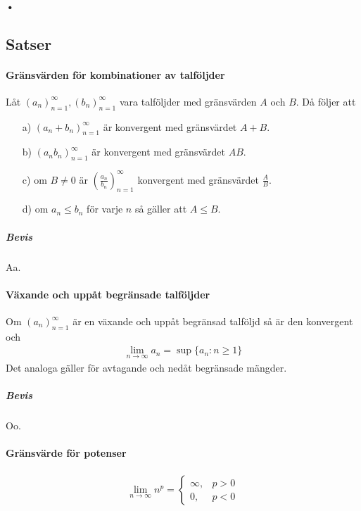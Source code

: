 \paragraph{•}

\subsection{Satser}

\paragraph{Gränsvärden för kombinationer av talföljder}
Låt $\left(a_n\right)_{n = 1}^\infty, \left(b_n\right)_{n = 1}^\infty$ vara talföljder med gränsvärden $A$ och $B$. Då följer att
\begin{enumerate}
	\item[a)] $\left(a_n + b_n\right)_{n = 1}^\infty$ är konvergent med gränsvärdet $A + B$.
	\item[b)] $\left(a_n b_n\right)_{n = 1}^\infty$ är konvergent med gränsvärdet $AB$.
	\item[c)] om $B \neq 0$ är $\left(\frac{a_n}{b_n}\right)_{n = 1}^\infty$ konvergent med gränsvärdet $\frac{A}{B}$.
	\item[d)] om $a_n \leq b_n$ för varje $n$ så gäller att $A \leq B$.
\end{enumerate}

\subparagraph{Bevis}
Aa.

\paragraph{Växande och uppåt begränsade talföljder}
Om $\left(a_n\right)_{n = 1}^\infty$ är en växande och uppåt begränsad talföljd så är den konvergent och
\begin{align*}
	\lim_{n\to\infty} a_n = \sup{\{a_n: n \geq 1\}}
\end{align*}
Det analoga gäller för avtagande och nedåt begränsade mängder.

\subparagraph{Bevis}
Oo.

\paragraph{Gränsvärde för potenser}
\begin{align*}
	\lim_{n\to\infty} n^p =
	\begin{cases}
		\infty, & p > 0\\
		0,      & p < 0
	\end{cases}
\end{align*}